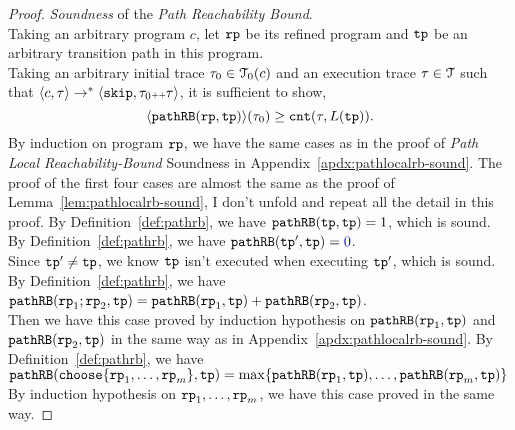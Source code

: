 \begin{proof}
\emph{Soundness} of the \emph{Path Reachability Bound}.
  \\
  Taking an arbitrary program $c$, let $\mathtt{rp}$ be its refined program and $\mathtt{tp}$ be an arbitrary transition path in this program.
  \\
Taking an arbitrary initial trace $\mathtt{\tau}_0 \in \mathcal{T}_0(c)$  and an execution trace $\mathtt{\tau} \in \mathcal{T}$
 such that $\langle {c}, \mathtt{\tau} \rangle \to^{*} \langle \mathtt{skip}, \mathtt{\tau}_0 {\scriptscriptstyle ++} \mathtt{\tau} \rangle$,
 it is sufficient to show,
 \[
 \langle \mathtt{pathRB}(\mathtt{rp}, \mathtt{tp}) \rangle(\mathtt{\tau}_0) \geq \mathtt{cnt}(\mathtt{\tau}, L(\mathtt{tp})) .
 \]
By induction on program $\mathtt{rp}$, we have the same cases as in the proof of \emph{Path Local Reachability-Bound} Soundness in Appendix~\ref{apdx:pathlocalrb-sound}.
The proof of the first four cases are almost the same as the proof of Lemma~\ref{lem:pathlocalrb-sound}, I don't unfold and repeat all the detail in this proof.
\caseL{$\rprog = \tpath$}
By Definition~\ref{def:pathrb}, we have $\mathtt{pathRB}(\mathtt{tp}, \mathtt{tp}) = 1$, which is sound.
By Definition~\ref{def:pathrb}, we have $\inoutB(\tpath', \tpath) = \highlight{0}$.
\\
Since $\mathtt{tp}' \neq \mathtt{tp}$, we know $\mathtt{tp}$ isn't executed when executing $\mathtt{tp}'$, which is sound.
By Definition~\ref{def:pathrb}, we have $\mathtt{pathRB}(\mathtt{rp}_1;\mathtt{rp}_2, \mathtt{tp}) = \mathtt{pathRB}(\mathtt{rp}_1, \mathtt{tp}) + \mathtt{pathRB}(\mathtt{rp}_2, \mathtt{tp}) $.
\\
Then we have this case proved by induction hypothesis on $\mathtt{pathRB}(\mathtt{rp}_1, \mathtt{tp})$ and $\mathtt{pathRB}(\mathtt{rp}_2, \mathtt{tp})$ in the same way as in Appendix~\ref{apdx:pathlocalrb-sound}.
By Definition~\ref{def:pathrb}, we have $\inoutB(\rpchoose{\rprog_1, \ldots, \rprog_m }, \tpath) = 
\max\left\{ \inoutB(\rprog_1, \tpath), \ldots, \inoutB(\rprog_m, \tpath) \right\}$ 
By induction hypothesis on $\mathtt{rp}_1, \ldots, \mathtt{rp}_m$, we have this case proved in the same way.


\end{proof}
